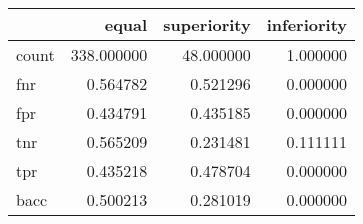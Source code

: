 \begin{tabular}{lrrr}
\toprule
{} &       equal &  superiority &  inferiority \\
\midrule
count &  338.000000 &    48.000000 &     1.000000 \\
fnr   &    0.564782 &     0.521296 &     0.000000 \\
fpr   &    0.434791 &     0.435185 &     0.000000 \\
tnr   &    0.565209 &     0.231481 &     0.111111 \\
tpr   &    0.435218 &     0.478704 &     0.000000 \\
bacc  &    0.500213 &     0.281019 &     0.000000 \\
\bottomrule
\end{tabular}
